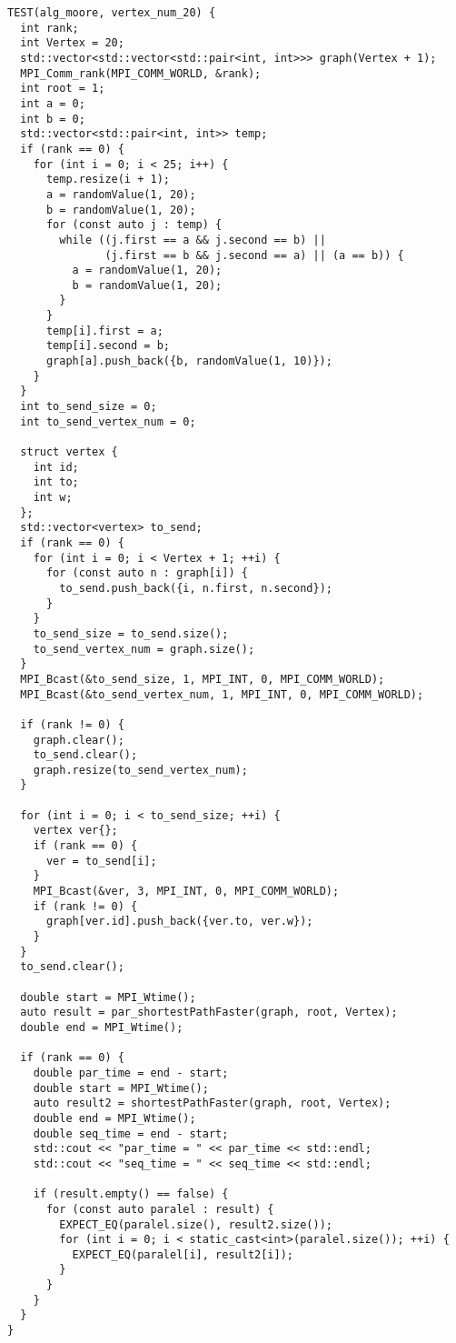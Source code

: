 \documentclass{report}
\begin{document}
\begin{lstlisting}
TEST(alg_moore, vertex_num_20) {
  int rank;
  int Vertex = 20;
  std::vector<std::vector<std::pair<int, int>>> graph(Vertex + 1);
  MPI_Comm_rank(MPI_COMM_WORLD, &rank);
  int root = 1;
  int a = 0;
  int b = 0;
  std::vector<std::pair<int, int>> temp;
  if (rank == 0) {
    for (int i = 0; i < 25; i++) {
      temp.resize(i + 1);
      a = randomValue(1, 20);
      b = randomValue(1, 20);
      for (const auto j : temp) {
        while ((j.first == a && j.second == b) ||
               (j.first == b && j.second == a) || (a == b)) {
          a = randomValue(1, 20);
          b = randomValue(1, 20);
        }
      }
      temp[i].first = a;
      temp[i].second = b;
      graph[a].push_back({b, randomValue(1, 10)});
    }
  }
  int to_send_size = 0;
  int to_send_vertex_num = 0;

  struct vertex {
    int id;
    int to;
    int w;
  };
  std::vector<vertex> to_send;
  if (rank == 0) {
    for (int i = 0; i < Vertex + 1; ++i) {
      for (const auto n : graph[i]) {
        to_send.push_back({i, n.first, n.second});
      }
    }
    to_send_size = to_send.size();
    to_send_vertex_num = graph.size();
  }
  MPI_Bcast(&to_send_size, 1, MPI_INT, 0, MPI_COMM_WORLD);
  MPI_Bcast(&to_send_vertex_num, 1, MPI_INT, 0, MPI_COMM_WORLD);

  if (rank != 0) {
    graph.clear();
    to_send.clear();
    graph.resize(to_send_vertex_num);
  }

  for (int i = 0; i < to_send_size; ++i) {
    vertex ver{};
    if (rank == 0) {
      ver = to_send[i];
    }
    MPI_Bcast(&ver, 3, MPI_INT, 0, MPI_COMM_WORLD);
    if (rank != 0) {
      graph[ver.id].push_back({ver.to, ver.w});
    }
  }
  to_send.clear();

  double start = MPI_Wtime();
  auto result = par_shortestPathFaster(graph, root, Vertex);
  double end = MPI_Wtime();

  if (rank == 0) {
    double par_time = end - start;
    double start = MPI_Wtime();
    auto result2 = shortestPathFaster(graph, root, Vertex);
    double end = MPI_Wtime();
    double seq_time = end - start;
    std::cout << "par_time = " << par_time << std::endl;
    std::cout << "seq_time = " << seq_time << std::endl;

    if (result.empty() == false) {
      for (const auto paralel : result) {
        EXPECT_EQ(paralel.size(), result2.size());
        for (int i = 0; i < static_cast<int>(paralel.size()); ++i) {
          EXPECT_EQ(paralel[i], result2[i]);
        }
      }
    }
  }
}


\end{lstlisting}
\end{document}
